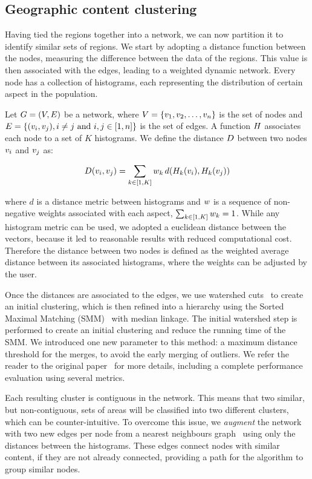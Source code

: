\subsection{Geographic content clustering}
Having tied the regions together into a network, we can now partition it to
identify similar sets of regions. We start by adopting a distance function
between the nodes, measuring the difference between the data of the regions.
This value is then associated with the edges, leading to a weighted dynamic
network. Every node has a collection of histograms, each representing the
distribution of certain aspect in the population.

Let $G=(V,E)$ be a network, where
$V=\{v_1,v_2,\dots,v_n\}$ is the set of nodes and
$E=\{(v_i,v_j), i\not=j\text{ and }i,j \in [1,n]\}$ is the set of
edges. A function $H$ associates each node to a set of $K$ histograms. We
define the distance $D$ between two nodes $v_i$ and $v_j$ as:

\begin{equation}
    D(v_i,v_j)=\sum_{k \in [1,K]}{w_k\, d(H_k(v_i),H_k(v_j))}
    \label{eq:dist}
\end{equation}

\noindent where $d$ is a distance metric between histograms and $w$ is a
sequence of non-negative weights associated with each aspect,
$\sum_{k\in[1,K]}{w_k}=1$. While any histogram metric can be used, we
adopted a euclidean distance between the vectors, because it led to reasonable
results with reduced computational cost. Therefore the distance between two
nodes is defined as the weighted average distance between its associated
histograms, where the weights can be adjusted by the user.

Once the distances are associated to the edges, we use watershed
cuts~\citep{Cousty2009} to create an initial clustering, which is then refined
into a hierarchy using the Sorted Maximal Matching (SMM)~\citep{markus2017} with
median linkage. The initial watershed step is performed to create an initial
clustering and reduce the running time of the SMM. We introduced one new
parameter to this method: a maximum distance threshold for the merges, to avoid
the early merging of outliers. We refer the reader to the original
paper~\citep{markus2017} for more details, including a complete performance
evaluation using several metrics.


Each resulting cluster is contiguous in the network. This means that two
similar, but non-contiguous, sets of areas will be classified into two different
clusters, which can be counter-intuitive. To overcome this issue, we
\emph{augment} the network with two new edges per node from a nearest neighbours
graph~\citep{scikit-learn} using only the distances between the histograms.
These edges connect nodes with similar content, if they are not already
connected, providing a path for the algorithm to group similar nodes.



